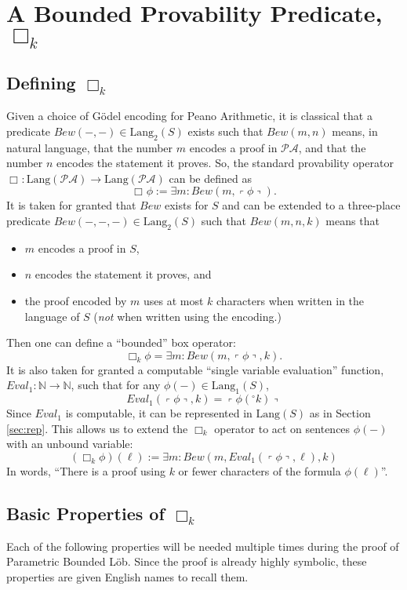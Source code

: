 \documentclass[onecolumn]{miri-tech-article}
\numberwithin{equation}{section}
\theoremstyle{definition}
\newcommand{\NN}{\mathbb{N}}
\newcommand{\bx}[1]{\Box_{#1}}
\newcommand{\PA}{\mathcal{P}\!\mathcal{A}}
\newcommand{\Lang}{\mathrm{Lang}}
\renewcommand{\to}{\rightarrow}
\newcommand{\qquote}[1]{\left\ulcorner #1 \right\urcorner}
\newcommand{\numeral}{{}^\circ}
\renewcommand{\-}{^{-1}}
\begin{document}
\section{A Bounded Provability Predicate, \texorpdfstring{$\bx{k}$}{box k}} \label{sec:bpp}
\subsection{Defining \texorpdfstring{$\bx{k}$}{box k}}
Given a choice of G\"{o}del encoding for Peano Arithmetic, it is classical that a predicate $Bew(-,-) \in \Lang_2(S)$ exists such that $Bew(m,n)$ means, in natural language, that the number $m$ encodes a proof in $\PA$, and that the number $n$ encodes the statement it proves.  So, the standard provability operator $\bx{}:\Lang(\PA)\to\Lang(\PA)$ can be defined as
$$\bx{}\phi := \exists m : Bew(m,\qquote\phi).$$
It is taken for granted that $Bew$ exists for $S$ and can be extended to a three-place predicate $Bew(-,-,-) \in \Lang_2(S)$ such that $Bew(m,n,k)$ means that 

\begin{itemize}
\item $m$ encodes a proof in $S$,
\item $n$ encodes the statement it proves, and
\item the proof encoded by $m$ uses at most $k$ characters when written in the language of $S$ ({\em not} when written using the encoding.)
\end{itemize}
%
Then one can define a ``bounded'' box operator:
$$\bx{k}\phi = \exists m : Bew(m,\qquote{\phi},k).$$
It is also taken for granted a computable ``single variable evaluation'' function, $Eval_1:\NN\to\NN$, such that for any $\phi(-)\in\Lang_1(S)$, 
$$Eval_1(\qquote\phi,k) = \qquote{\phi(\numeral k)}$$
Since $Eval_1$ is computable, it can be represented in $\Lang(S)$ as in Section \ref{sec:rep}.  
This allows us to extend the $\bx{k}$ operator to act on sentences $\phi(-)$ with an unbound variable:
%
$$(\bx{k}\phi)(\ell) := \exists m : Bew(m,Eval_1(\qquote\phi,\ell),k)$$
%
In words, ``There is a proof using $k$ or fewer characters of the formula $\phi(\ell)$''.

\subsection{Basic Properties of \texorpdfstring{$\bx{k}$}{box k}}
Each of the following properties will be needed multiple times during the proof of Parametric Bounded L\"{o}b.  Since the proof is already highly symbolic, these properties are given English names to recall them. 
\end{document}
